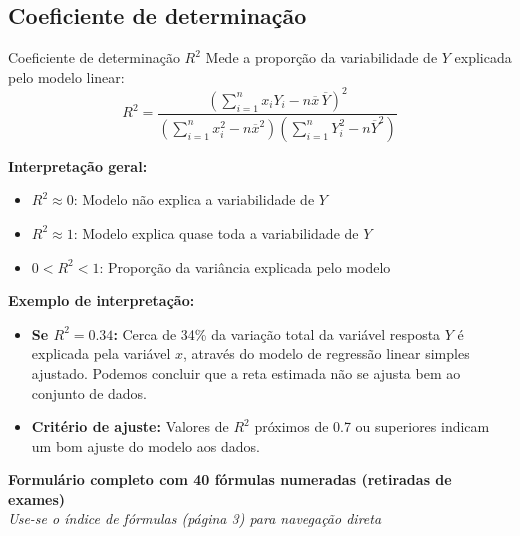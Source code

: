 \documentclass[a4paper,12pt]{article}
\begin{document}
\subsection{Coeficiente de determinação}

\begin{formulabox}{Coeficiente de determinação $R^2$}
Mede a proporção da variabilidade de $Y$ explicada pelo modelo linear:
\begin{equation}\label{formula40}\tag{Fórmula 40}
    R^2 = \frac{\left( \sum_{i=1}^n x_i Y_i - n \overline{x} \, \overline{Y} \right)^2}{\left( \sum_{i=1}^n x_i^2 - n \overline{x}^2 \right) \left( \sum_{i=1}^n Y_i^2 - n \overline{Y}^2 \right)}
\end{equation}

\textbf{Interpretação geral:}
\begin{itemize}
    \item $R^2 \approx 0$: Modelo não explica a variabilidade de $Y$
    \item $R^2 \approx 1$: Modelo explica quase toda a variabilidade de $Y$
    \item $0 < R^2 < 1$: Proporção da variância explicada pelo modelo
\end{itemize}

\textbf{Exemplo de interpretação:}
\begin{itemize}
    \item \textbf{Se $R^2 = 0.34$:} Cerca de 34\% da variação total da variável resposta $Y$ é explicada pela variável $x$, através do modelo de regressão linear simples ajustado. Podemos concluir que a reta estimada não se ajusta bem ao conjunto de dados.
    \item \textbf{Critério de ajuste:} Valores de $R^2$ próximos de 0.7 ou superiores indicam um bom ajuste do modelo aos dados.
\end{itemize}
\end{formulabox}

\vfill
\begin{center}
\textbf{\large Formulário completo com 40 fórmulas numeradas (retiradas de exames)}\\
\textit{Use-se o índice de fórmulas (página 3) para navegação direta}
\end{center}
\end{document}
